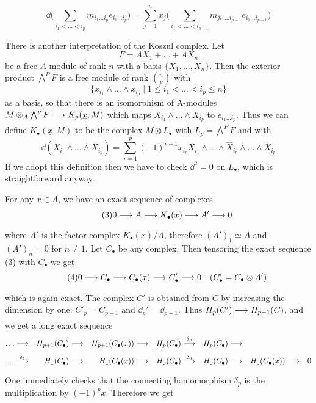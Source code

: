 \documentclass[../main]{subfiles}
\begin{document}
\[\tag{18.2}\label{eqn:18.2} \dd\bigg(\sum_{i_1<\dots<i_p}m_{i_1 \dots i_{p}} e_{i_{1} \dots i_{p}} \bigg)=\sum_{j=1}^n x_j\bigg( \sum_{i_1<\dots<i_{p-1}}m_{j i_1 \dots i_{p-1}} e_{i_{1} \dots i_{p-1}}\bigg)\]

There is another interpretation of the Koszul complex.
Let \[F=A X_{1}+\dots+AX_{n}\] be a free $A$-module of rank $n$ with a
basis $\{X_{1}, \dots, X_{n}\}$. Then the exterior product $\bigwedge^{P} F$ is a
free module of rank $\displaystyle\binom{n}{p}$ with \[\{x_{i_{1}} \wedge \dots \wedge x_{i_{p}} \mid 1 \leqslant i_{1}<\dots<i_{p} \leqslant n\}\]
as a basis, so that there is an isomorphism of A-modules $M \otimes_{A} \bigwedge^{p} F\varrightarrow{} K_{p}(\underline{x}, M)$ which maps $X_{i_{1}} \wedge \dots \wedge X_{i_{p}}$ to $e_{i_{1} \dots i_{p}}$.
Thus we can define $K_\bullet(\underline{x}, M)$ to be the complex $M \otimes L_\bullet$ with $L_{p}=\bigwedge^PF$ and with
\[\dd(X_{i_1}\wedge\dots \wedge X_{i_p}) = \sum_{r=1}^p (-1)^{r-1} x_{i_r} X_{i_1}\wedge\dots \wedge\widehat{X}_{i_r} \wedge\dots\wedge X_{i_p}\]
 If we adopt this definition then we have to check $\dd^{2}=0$ on $L_\bullet$, which is straightforward anyway.

For any $x \in A$, we have an exact sequence of complexes
\[\tag{3} 0 \varrightarrow{} A \varrightarrow{} K_\bullet (x) \varrightarrow{} A' \varrightarrow{}0\]
where $A'$ is the factor complex $K_\bullet(x) / A$, therefore $(A')_{1} \simeq A$ and $(A')_{n}=0$ for $n \neq 1$. Let $C_\bullet$ be any complex. Then tensoring the exact sequence (3) with $C_\bullet$ we get
\[\tag{4}
0 \varrightarrow{} C_\bullet\varrightarrow{}C_\bullet(x) \varrightarrow{} C'_\bullet\varrightarrow{}0 \for{C'_\bullet=C_\bullet \otimes A'}
\]
which is again exact. The complex $C'$ is obtained from $C$ by increasing the dimension by one: $C'_{p}=C_{p-1}$ and $\dd_p' = \dd_{p-1}$. Thus $H_{p}(C') \varrightarrow{} H_{p-1}(C)$, and we get a long exact sequence
\[\begin{aligned}\dots &\varrightarrow{}& H_{p+1}(C_\bullet) &\varrightarrow{}& H_{p+1}(C_\bullet (x))& \varrightarrow{}& H_p(C_\bullet) &\varrightarrow{\delta_p}& H_p(C_\bullet)&\varrightarrow{}& \\ \dots &\varrightarrow{\delta_1}&H_1(C_\bullet)&\varrightarrow{}&H_1(C_\bullet(x))&\varrightarrow{}&H_0(C_\bullet)&\varrightarrow{\delta_0}&H_0(C_\bullet)&\varrightarrow{}&H_0(C_\bullet(x))&\varrightarrow{}&0\end{aligned}\]
One immediately checks that the connecting homomorphism $\delta_{p}$ is the multiplication by $(-1)^{p} x$. Therefore we get
\end{document}
